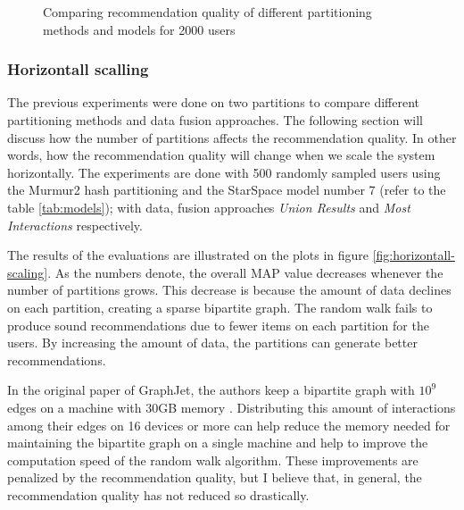 \begin{figure}[h!]
    \centering
    
    \caption{Comparing recommendation quality of different partitioning methods and models for 2000 users}
    \label{plot:hyperparameter-recommendation-quality-2000-users}
\end{figure}



\subsubsection{Horizontall scalling}
\label{subsubsec:eval-horizontall-scalling}
The previous experiments were done on two partitions to compare different partitioning methods and data fusion approaches. The following section will discuss how the number of partitions affects the recommendation quality. In other words, how the recommendation quality will change when we scale the system horizontally. The experiments are done with 500 randomly sampled users using the Murmur2 hash partitioning and the StarSpace model number 7 (refer to the table \ref{tab:models}); with data, fusion approaches \emph{Union Results} and \emph{Most Interactions} respectively.


The results of the evaluations are illustrated on the plots in figure \ref{fig:horizontall-scaling}. As the numbers denote, the overall MAP value decreases whenever the number of partitions grows. This decrease is because the amount of data declines on each partition, creating a sparse bipartite graph. The random walk fails to produce sound recommendations due to fewer items on each partition for the users. By increasing the amount of data, the partitions can generate better recommendations. 


In the original paper of GraphJet, the authors keep a bipartite graph with $10^9$ edges on a machine with 30GB memory \cite{sharmaGraphJetRealtimeContent2016}. Distributing this amount of interactions among their edges on 16 devices or more can help reduce the memory needed for maintaining the bipartite graph on a single machine and help to improve the computation speed of the random walk algorithm. These improvements are penalized by the recommendation quality, but I believe that, in general, the recommendation quality has not reduced so drastically.

